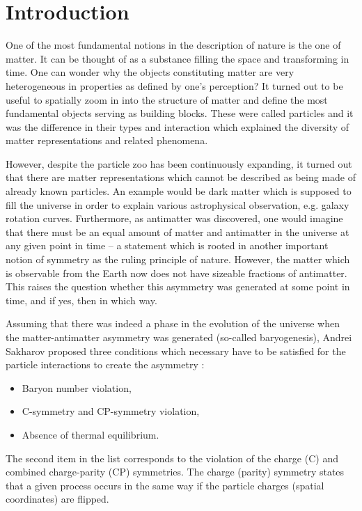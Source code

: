 \chapter{Introduction}\label{sec:intro}

One of the most fundamental notions in the description of nature is the one of matter. It can be thought of as a substance filling the space and transforming in time. One can wonder why the objects constituting matter are very heterogeneous in properties as defined by one's perception? It turned out to be useful to spatially zoom in into the structure of matter and define the most fundamental objects serving as building blocks. These were called particles and it was the difference in their types and interaction which explained the diversity of matter representations and related phenomena.    

However, despite the particle zoo has been continuously expanding, it turned out that there are matter representations which cannot be described as being made of already known particles. An example would be dark matter which is supposed to fill the universe in order to explain various astrophysical observation, e.g. galaxy rotation curves. Furthermore, as antimatter was discovered, one would imagine that there must be an equal amount of matter and antimatter in the universe at any given point in time  -- a statement which is rooted in another important notion of symmetry as the ruling principle of nature. However, the matter which is observable from the Earth now does not have sizeable fractions of antimatter. This raises the question whether this asymmetry was generated at some point in time, and if yes, then in which way.

Assuming that there was indeed a phase in the evolution of the universe when the matter-antimatter asymmetry was generated (so-called baryogenesis), Andrei Sakharov proposed three conditions which necessary have to be satisfied for the particle interactions to create the asymmetry \cite{Sakharov:1991}:
\begin{itemize}
    \item Baryon number violation,
    \item C-symmetry and CP-symmetry violation,
    \item Absence of thermal equilibrium.
\end{itemize}

The second item in the list corresponds to the violation of the charge (C) and combined charge-parity (CP) symmetries. The charge (parity) symmetry states that a given process occurs in the same way if the particle charges (spatial coordinates) are flipped. 

